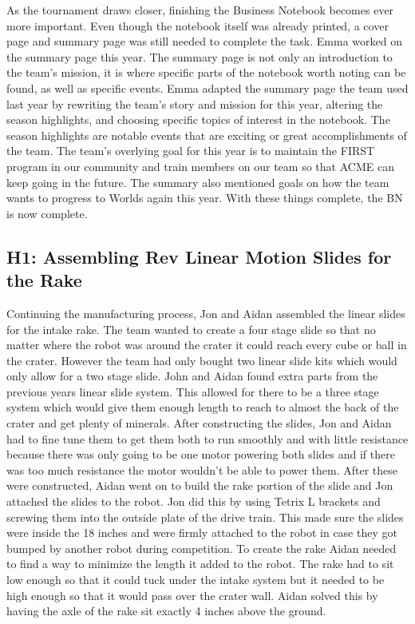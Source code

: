 \documentclass{article}
\begin{document}
As the tournament draws closer, finishing the Business Notebook becomes ever more important. Even though the notebook itself was already printed, a cover page and summary page was still needed to complete the task. Emma worked on the summary page this year. The summary page is not only an introduction to the team's mission, it is where specific parts of the notebook worth noting can be found, as well as specific events. Emma adapted the summary page the team used last year by rewriting the team's story and mission for this year, altering the season highlights, and choosing specific topics of interest in the notebook. The season highlights are notable events that are exciting or great accomplishments of the team. The team's overlying goal for this year is to maintain the FIRST program in our community and train members on our team so that ACME can keep going in the future. The summary also mentioned goals on how the team wants to progress to Worlds again this year. With these things complete, the BN is now complete.  


\subsection{H1: Assembling Rev Linear Motion Slides for the Rake}

Continuing the manufacturing process, Jon and Aidan assembled the linear slides for the intake rake. The team wanted to create a four stage slide so that no matter where the robot was around the crater it could reach every cube or ball in the crater. However the team had only bought two linear slide kits which would only allow for a two stage slide. John and Aidan found extra parts from the previous years linear slide system. This allowed for there to be a three stage system which would give them enough length to reach to almost the back of the crater and get plenty of minerals. After constructing the slides, Jon and Aidan had to fine tune them to get them both to run smoothly and with little resistance because there was only going to be one motor powering both slides and if there was too much resistance the motor wouldn't be able to power them. After these were constructed, Aidan went on to build the rake portion of the slide and Jon attached the slides to the robot. Jon did this by using Tetrix L brackets and screwing them into the outside plate of the drive train. This made sure the slides were inside the 18 inches and were firmly attached to the robot in case they got bumped by another robot during competition. To create the rake Aidan needed to find a way to minimize the length it added to the robot. The rake had to sit low enough so that it could tuck under the intake system but it needed to be high enough so that it would pass over the crater wall. Aidan solved this by having the axle of the rake sit exactly 4 inches above the ground.
\end{document}
